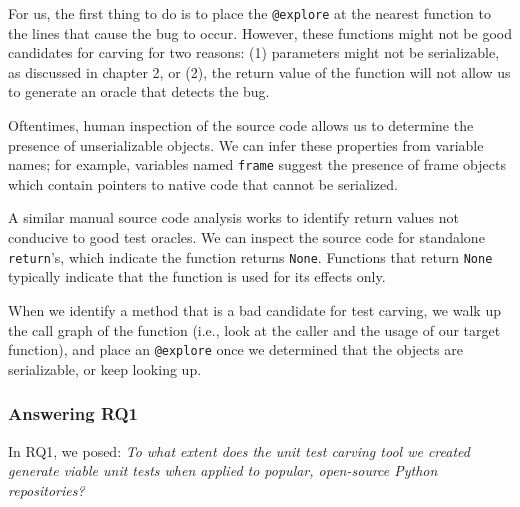For us, the first thing to do is to place the \verb|@explore| at the nearest function to the lines that cause
the bug to occur.
However, these functions might not be good candidates for carving for two reasons: (1) parameters might not
be serializable, as discussed in chapter
2, or (2), the return value of the function will not allow us to generate an oracle that detects the bug.

Oftentimes, human inspection of the source code allows us to determine the presence of unserializable
objects. We can infer these properties from
variable names; for example, variables named \verb|frame| suggest the presence of frame objects which contain
pointers to native code that cannot be serialized.

A similar manual source code analysis works to identify return values not conducive to good test oracles.
We can inspect the source code for standalone \verb|return|'s, which indicate the function returns \verb|None|.
Functions that return \verb|None| typically indicate that the function is used for its effects only.


When we identify a method that is a bad candidate for test carving, we walk up the call graph of the
function (i.e., look at the caller and the
usage of our target function), and place an \verb|@explore| once we determined that the objects are
serializable, or keep looking up.


\subsubsection{Answering RQ1}
In RQ1, we posed: \textit{To what extent does the unit test carving tool we created generate viable unit tests
      when applied to popular, open-source Python repositories?}


